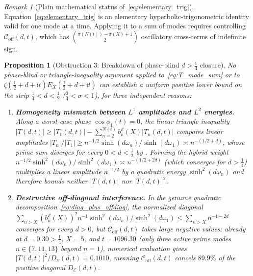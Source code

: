 \documentclass[11pt,reqno]{amsart}
\theoremstyle{plain}
\newtheorem{proposition}[theorem]{Proposition}
\theoremstyle{definition}
\theoremstyle{remark}
\newtheorem{remark}[theorem]{Remark}
\numberwithin{equation}{section}
\newcommand{\ii}{\mathrm{i}}
\begin{document}
\begin{remark}[Plain mathematical status of~\eqref{eq:elementary_trig}]\label{rem:elementary}
Equation~\eqref{eq:elementary_trig} is an elementary hyperbolic-trigonometric identity valid for one mode at a time. Applying it to a sum of modes requires controlling $\mathcal{C}_{\mathrm{off}}(d,t)$, which has $\binom{\pi(N(t)) - \pi(X) + 1}{2}$ oscillatory cross-terms of indefinite sign.
\end{remark}

\begin{proposition}[Obstruction 3: Breakdown of phase-blind $d > \frac{1}{4}$ closure]\label{prop:offdiag_obstruction}
No phase-blind or triangle-inequality argument applied to~\eqref{eq:T_mode_sum} or to $\zeta(\frac{1}{2}+d+\ii t)E_X(\frac{1}{2}+d+\ii t)$ can establish a uniform positive lower bound on the strip $\frac{1}{4} < d < \frac{1}{2}$ ($\frac{3}{4} < \sigma < 1$), for three independent reasons:
\begin{enumerate}[label=\textup{(\roman*)},leftmargin=2.2em]
\item \textbf{Homogeneity mismatch between $L^1$ amplitudes and $L^2$ energies.} Along a worst-case phase $\cos\phi_1(t) = 0$, the linear triangle inequality $\lvert T(d,t)\rvert \ge \lvert T_1(d,t)\rvert - \sum_{n=2}^{N(t)} b_n^{\mathcal{E}}(X)\lvert T_n(d,t)\rvert$ compares linear amplitudes $\lvert T_n\rvert / \lvert T_1\rvert \ge n^{-1/2}\sinh(d\omega_n)/\sinh(d\omega_1) \asymp n^{-(1/2 + d)}$, whose prime sum diverges for every $0 < d < \frac{1}{2}$ by . Forming the hybrid weight $n^{-1/2}\sinh^2(d\omega_n)/\sinh^2(d\omega_1) \asymp n^{-(1/2 + 2d)}$ (which converges for $d > \frac{1}{4}$) multiplies a linear amplitude $n^{-1/2}$ by a quadratic energy $\sinh^2(d\omega_n)$ and therefore bounds neither $\lvert T(d,t)\rvert$ nor $\lvert T(d,t)\rvert^2$.
\item \textbf{Destructive off-diagonal interference.} In the genuine quadratic decomposition~\eqref{eq:diag_plus_offdiag}, the normalized diagonal $\sum_{n > X} (b_n^{\mathcal{E}}(X))^2 n^{-1}\sinh^2(d\omega_n)/\sinh^2(d\omega_1) \le \sum_{n > X} n^{-1-2d}$ converges for every $d > 0$, but $\mathcal{C}_{\mathrm{off}}(d,t)$ takes large negative values: already at $d = 0.30 > \frac{1}{4}$, $X = 5$, and $t = 1096.30$ (only three active prime modes $n \in \{7, 11, 13\}$ beyond $n = 1$), numerical evaluation gives $\lvert T(d,t)\rvert^2 / D_{\mathcal{E}}(d,t) = 0.1010$, meaning $\mathcal{C}_{\mathrm{off}}(d,t)$ cancels $89.9\%$ of the positive diagonal $D_{\mathcal{E}}(d,t)$.

\end{enumerate}
\end{proposition}
\end{document}
